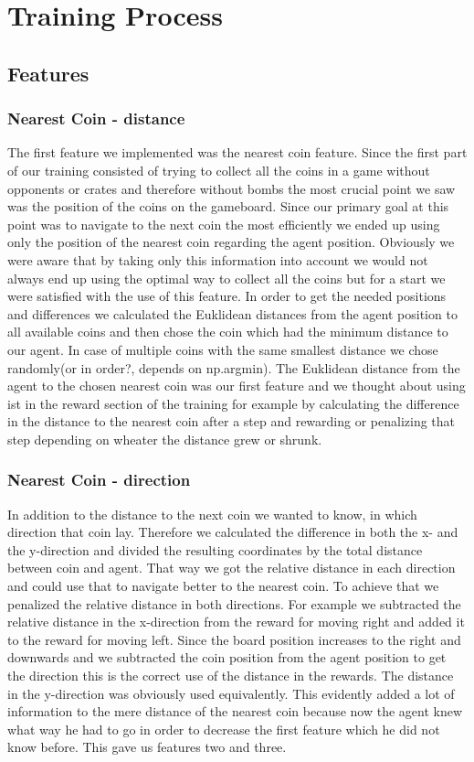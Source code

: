 \chapter{Training Process}

\section{Features}
\subsection{Nearest Coin - distance}
The first feature we implemented was the nearest coin feature. Since the first part of our training consisted of trying to collect all the coins in a game without opponents or crates and therefore without bombs the most crucial point we saw was the position of the coins on the gameboard. Since our primary goal at this point was to navigate to the next coin the most efficiently we ended up using only the position of the nearest coin regarding the agent position. Obviously we were aware that by taking only this information into account we would not always end up using the optimal way to collect all the coins but for a start we were satisfied with the use of this feature. In order to get the needed positions and differences we calculated the Euklidean distances from the agent position to all available coins and then chose the coin which had the minimum distance to our agent. In case of multiple coins with the same smallest distance we chose randomly(or in order?, depends on np.argmin). The Euklidean distance from the agent to the chosen nearest coin was our first feature and we thought about using ist in the reward section of the training for example by calculating the difference in the distance to the nearest coin after a step and rewarding or penalizing that step depending on wheater the distance grew or shrunk. 

\subsection{Nearest Coin - direction} 
In addition to the distance to the next coin we wanted to know, in which direction that coin lay. Therefore we calculated the difference in both the x- and the y-direction and divided the resulting coordinates by the total distance between coin and agent. That way we got the relative distance in each direction and could use that to navigate better to the nearest coin. To achieve that we penalized the relative distance in both directions. For example we subtracted the relative distance in the x-direction from the reward for moving right and added it to the reward for moving left. Since the board position increases to the right and downwards and we subtracted the coin position from the agent position to get the direction this is the correct use of the distance in the rewards. The distance in the y-direction was obviously used equivalently. This evidently added a lot of information to the mere distance of the nearest coin because now the agent knew what way he had to go in order to decrease the first feature which he did not know before. This gave us features two and three.

